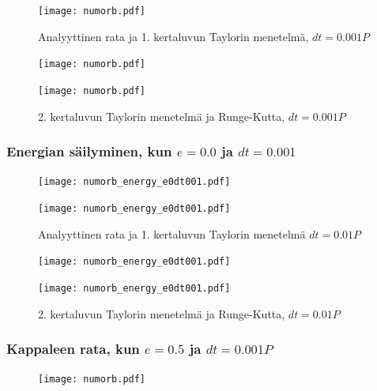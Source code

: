 \documentclass[12pt, a4paper]{article}
\begin{document}
\begin{figure}[H]%
\vspace*{-2.5cm}
\texttt{[image: numorb.pdf]}%
\caption{Analyyttinen rata ja 1. kertaluvun Taylorin menetelmä, $dt=0.001P$}
\end{figure}

\newpage
\begin{figure}[H]%
\texttt{[image: numorb.pdf]}%
\end{figure}

\begin{figure}[H]%
\vspace*{-2.5cm}
\texttt{[image: numorb.pdf]}%
\caption{2. kertaluvun Taylorin menetelmä ja Runge-Kutta, $dt=0.001P$}
\end{figure}

\newpage
\subsubsection{Energian säilyminen, kun $e=0.0$ ja $dt=0.001$}
\begin{figure}[H]
\vspace*{-1cm}
\texttt{[image: numorb\_energy\_e0dt001.pdf]}
\end{figure}

\begin{figure}[H]%
\vspace*{-2cm}
\texttt{[image: numorb\_energy\_e0dt001.pdf]}%
\caption{Analyyttinen rata ja 1. kertaluvun Taylorin menetelmä $dt=0.01P$}
\end{figure}

\newpage
\begin{figure}[H]%
\texttt{[image: numorb\_energy\_e0dt001.pdf]}%
\end{figure}

\begin{figure}[H]%
\vspace*{-2cm}
\texttt{[image: numorb\_energy\_e0dt001.pdf]}%
\caption{2. kertaluvun Taylorin menetelmä ja Runge-Kutta, $dt=0.01P$}
\end{figure}

\newpage
\subsubsection{Kappaleen rata, kun $e=0.5$ ja $dt=0.001P$}
\begin{figure}[H]
\vspace*{-1.5cm}
\texttt{[image: numorb.pdf]}
\end{figure}
\end{document}
